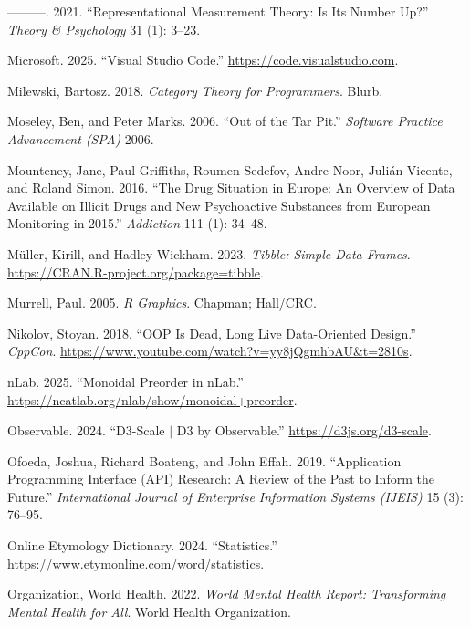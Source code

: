\documentclass[
]{book}
\newlength{\cslhangindent}
\newenvironment{CSLReferences}[2] %
 {\begin{list}{}{%
  \setlength{\itemindent}{0pt}
  \setlength{\leftmargin}{0pt}
  \setlength{\parsep}{0pt}
  \ifodd #1
   \setlength{\leftmargin}{\cslhangindent}
   \setlength{\itemindent}{-1\cslhangindent}
  \fi
  \setlength{\itemsep}{#2\baselineskip}}}
 {\end{list}}
\theoremstyle{definition}
\theoremstyle{definition}
\theoremstyle{definition}
\theoremstyle{definition}
\theoremstyle{remark}
\begin{document}
\begin{CSLReferences}{1}{0}
---------. 2021. {``Representational Measurement Theory: Is Its Number Up?''} \emph{Theory \& Psychology} 31 (1): 3--23.

Microsoft. 2025. {``{Visual Studio Code}.''} \url{https://code.visualstudio.com}.

Milewski, Bartosz. 2018. \emph{Category Theory for Programmers}. Blurb.

Moseley, Ben, and Peter Marks. 2006. {``Out of the Tar Pit.''} \emph{Software Practice Advancement (SPA)} 2006.

Mounteney, Jane, Paul Griffiths, Roumen Sedefov, Andre Noor, Julián Vicente, and Roland Simon. 2016. {``The Drug Situation in Europe: An Overview of Data Available on Illicit Drugs and New Psychoactive Substances from European Monitoring in 2015.''} \emph{Addiction} 111 (1): 34--48.

Müller, Kirill, and Hadley Wickham. 2023. \emph{Tibble: Simple Data Frames}. \url{https://CRAN.R-project.org/package=tibble}.

Murrell, Paul. 2005. \emph{R Graphics}. Chapman; Hall/CRC.

Nikolov, Stoyan. 2018. {``OOP Is Dead, Long Live Data-Oriented Design.''} \emph{CppCon}. \url{https://www.youtube.com/watch?v=yy8jQgmhbAU&t=2810s}.

nLab. 2025. {``Monoidal Preorder in nLab.''} \url{https://ncatlab.org/nlab/show/monoidal+preorder}.

Observable. 2024. {``D3-Scale {\(\vert\)} D3 by Observable.''} \url{https://d3js.org/d3-scale}.

Ofoeda, Joshua, Richard Boateng, and John Effah. 2019. {``Application Programming Interface (API) Research: A Review of the Past to Inform the Future.''} \emph{International Journal of Enterprise Information Systems (IJEIS)} 15 (3): 76--95.

Online Etymology Dictionary. 2024. {``Statistics.''} \url{https://www.etymonline.com/word/statistics}.

Organization, World Health. 2022. \emph{World Mental Health Report: Transforming Mental Health for All}. World Health Organization.


\end{CSLReferences}
\end{document}
